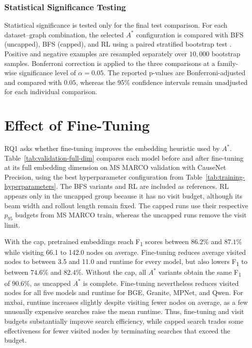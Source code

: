 \subsubsection{Statistical Significance Testing}

Statistical significance is tested only for the final test comparison. For each dataset--graph combination, the selected \(A^*\) configuration is compared with BFS (uncapped), BFS (capped), and RL using a paired stratified bootstrap test \citep{koehn:2004,dror:2018}. Positive and negative examples are resampled separately over \(10{,}000\) bootstrap samples. Bonferroni correction is applied to the three comparisons at a family-wise significance level of \(\alpha=0.05\). The reported p-values are Bonferroni-adjusted and compared with \(0.05\), whereas the 95\% confidence intervals remain unadjusted for each individual comparison.

\section{Effect of Fine-Tuning}
\label{sec:results-finetuning}

RQ1 asks whether fine-tuning improves the embedding heuristic used by $A^*$. Table~\ref{tab:validation-full-dim} compares each model before and after fine-tuning at its full embedding dimension on MS MARCO validation with CauseNet Precision, using the best hyperparameter configuration from Table~\ref{tab:training-hyperparameters}. The BFS variants and RL are included as references. RL appears only in the uncapped group because it has no visit budget, although its beam width and rollout length remain fixed. The capped runs use their respective $p_{95}$ budgets from MS MARCO train, whereas the uncapped runs remove the visit limit.

With the cap, pretrained embeddings reach F\textsubscript{1} scores between \(86.2\%\) and \(87.1\%\) while visiting 66.1 to 142.0 nodes on average. Fine-tuning reduces average visited nodes to between 3.5 and 11.0 and runtime for every model, but also lowers F\textsubscript{1} to between \(74.6\%\) and \(82.4\%\). Without the cap, all $A^*$ variants obtain the same F\textsubscript{1} of \(90.6\%\), as uncapped $A^*$ is complete. Fine-tuning nevertheless reduces visited nodes for all five models and runtime for BGE, Granite, MPNet, and Qwen. For mxbai, runtime increases slightly despite visiting fewer nodes on average, as a few unusually expensive searches raise the mean runtime. Thus, fine-tuning and visit budgets substantially improve search efficiency, while capped search trades some effectiveness for fewer visited nodes by terminating searches that exceed the budget.

